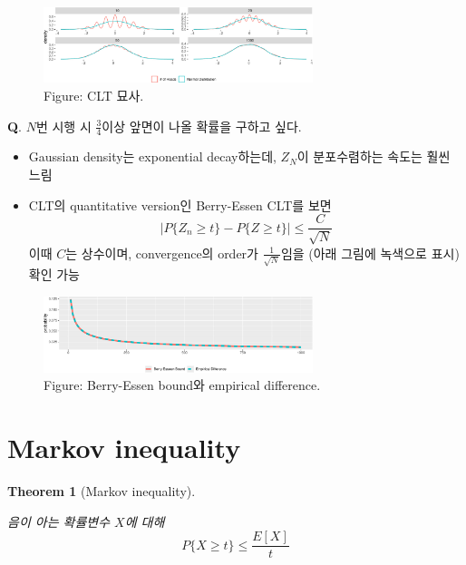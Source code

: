 \documentclass[
  13pt,
  letterpaper,
  DIV=11,
  numbers=noendperiod]{scrreprt}
\theoremstyle{definition}
\theoremstyle{plain}
\theoremstyle{definition}
\theoremstyle{plain}
\newtheorem{theorem}{Theorem}[chapter]
\theoremstyle{plain}
\theoremstyle{definition}
\theoremstyle{remark}
\begin{document}
\begin{figure}[th]

{\centering \includegraphics[width=0.7\textwidth,height=\textheight]{ineq_files/figure-pdf/unnamed-chunk-2-1.pdf}

}

\caption{Figure: CLT 묘사.}

\end{figure}%

\textbf{Q}. \(N\)번 시행 시 \(\frac{3}{4}\)이상 앞면이 나올 확률을
구하고 싶다.

\begin{itemize}
\item
  Gaussian density는 exponential decay하는데, \(Z_N\)이 분포수렴하는
  속도는 훨씬 느림
\item
  CLT의 quantitative version인 Berry-Essen CLT를 보면 \[
  |P\{Z_n \geq t\} - P\{Z \geq t\} | \leq \frac{C}{\sqrt{N}}
  \] 이때 \(C\)는 상수이며, convergence의 order가
  \(\frac{1}{\sqrt{N}}\)임을 (아래 그림에 녹색으로 표시) 확인 가능
\end{itemize}

\begin{figure}[th]

{\centering \includegraphics[width=0.7\textwidth,height=\textheight]{ineq_files/figure-pdf/unnamed-chunk-3-1.pdf}

}

\caption{Figure: Berry-Essen bound와 empirical difference.}

\end{figure}%

\section{Markov inequality}\label{markov-inequality}

\begin{theorem}[Markov
inequality]\protect\hypertarget{thm-markovineq}{}\label{thm-markovineq}

음이 아는 확률변수 \(X\)에 대해 \[
P\{ X\geq t\} \leq \frac{E[X]}{t}
\]

\end{theorem}
\end{document}
